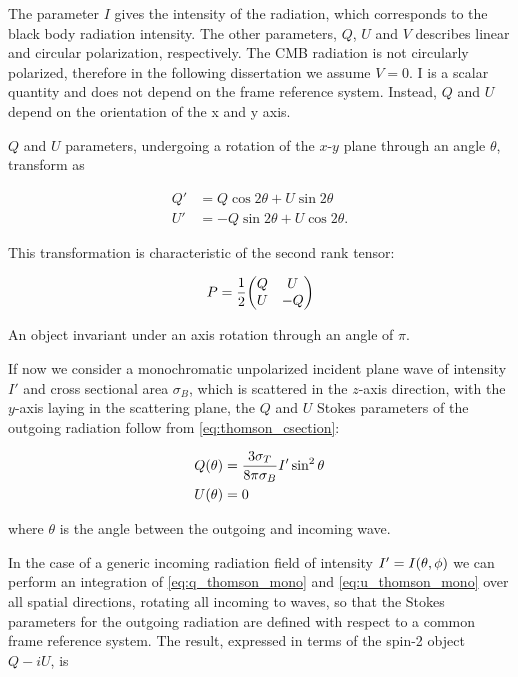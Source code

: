 The parameter $I$ gives the intensity of the radiation, which corresponds
to the black body radiation intensity. The other parameters, $Q$, $U$ and
$V$ describes linear and circular polarization, respectively. The CMB
radiation is not circularly polarized, therefore in the following
dissertation we assume $V = 0$. I is a scalar quantity and does not depend
on the frame reference system. Instead, $Q$ and $U$ depend on the
orientation of the x and y axis.

$Q$ and $U$ parameters, undergoing a rotation of the $x$-$y$ plane through
an angle $\theta$, transform as

\begin{align}
        Q' & = Q\cos{2\theta} + U\sin{2\theta} \\
        U' & = -Q\sin{2\theta} + U\cos{2\theta}.
\end{align}

This transformation is characteristic of the second rank tensor:

\begin{equation}
        P = \frac{1}{2} \mqty(Q & U \\
                              U & -Q)
\end{equation}

An object invariant under an axis rotation through an angle of $\pi$.

If now we consider a monochromatic unpolarized incident plane wave of
intensity $I'$ and cross sectional area $\sigma_B$, which is scattered in
the $z$-axis direction, with the $y$-axis laying in the scattering plane,
the $Q$ and $U$ Stokes parameters of the outgoing radiation follow from
\autoref{eq:thomson_csection}:

\begin{align}
        Q\qty(\theta) & = \frac{3\sigma_T}{8\pi\sigma_B}I'\sin^2\theta
        \label{eq:q_thomson_mono} \\
        U\qty(\theta) & = 0 \label{eq:u_thomson_mono}
\end{align}

where $\theta$ is the angle between the outgoing and incoming wave.

In the case of a generic incoming radiation field of intensity $I' =
I\qty(\theta,\phi)$ we can perform an integration of
\autoref{eq:q_thomson_mono} and \autoref{eq:u_thomson_mono} over all
spatial directions, rotating all incoming to waves, so that the Stokes
parameters for the outgoing radiation are defined with respect to a common
frame reference system. The result, expressed in terms of the spin-2 object
$Q - iU$, is

